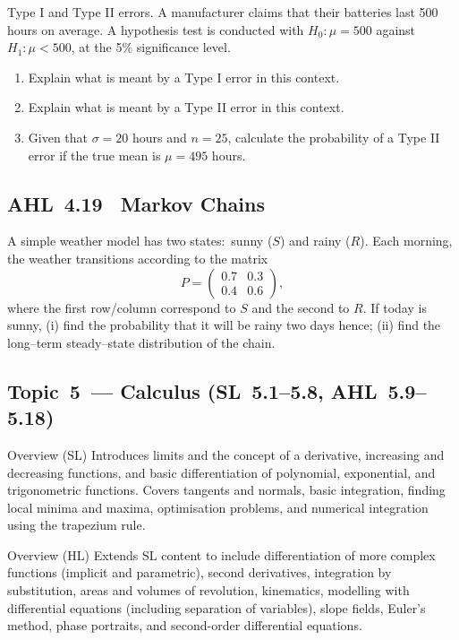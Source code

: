 \documentclass[11pt]{article}
\def\textbf#1{#1}%
\newcommand{\tocsubsection}[1]{\subsection{#1}}
\newcounter{question}
\begin{document}
\begin{question}
\textbf{Type I and Type II errors.}
A manufacturer claims that their batteries last 500 hours on average. A hypothesis test is conducted with $H_0\!:\mu=500$ against $H_1\!:\mu<500$, at the 5\% significance level.
\begin{enumerate}
    \item Explain what is meant by a Type I error in this context.
    \item Explain what is meant by a Type II error in this context.
    \item Given that $\sigma=20$ hours and $n=25$, calculate the probability of a Type II error if the true mean is $\mu=495$ hours.
\end{enumerate}
\end{question}



\tocsubsection{AHL 4.19 \; Markov Chains}

\begin{question}
A simple weather model has two states:\ sunny ($S$) and rainy ($R$).  Each
morning, the weather transitions according to the matrix
\[P=\begin{pmatrix}0.7 & 0.3\\0.4 & 0.6\end{pmatrix},\]
where the first row/column correspond to $S$ and the second to $R$.
If today is sunny, (i) find the probability that it will be rainy two days
hence; (ii) find the long–term steady–state distribution of the chain.
\end{question}










\tocsubsection{Topic 5 — Calculus (SL 5.1–5.8, AHL 5.9–5.18)}
\textbf{Overview (SL)}  
Introduces limits and the concept of a derivative, increasing and decreasing functions, and basic differentiation of polynomial, exponential, and trigonometric functions. Covers tangents and normals, basic integration, finding local minima and maxima, optimisation problems, and numerical integration using the trapezium rule.

\textbf{Overview (HL)}  
Extends SL content to include differentiation of more complex functions (implicit and parametric), second derivatives, integration by substitution, areas and volumes of revolution, kinematics, modelling with differential equations (including separation of variables), slope fields, Euler’s method, phase portraits, and second-order differential equations.
\end{document}
